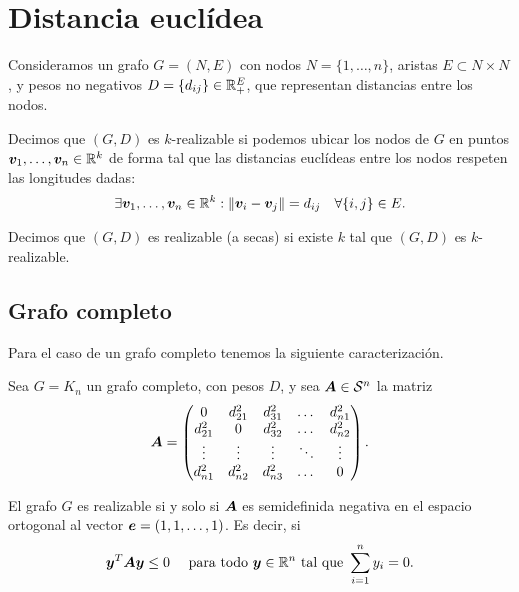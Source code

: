 \section{Distancia euclídea}

Consideramos un grafo $G = (N, E)$ con nodos $N = \{1, \dots, n\}$, aristas $E \subset N \times N$, y pesos no negativos $D = \{d_{ij}\} \in \mathbb{R}_+^E$, que representan distancias entre los nodos.

Decimos que $(G, D)$ es $k$-realizable si podemos ubicar los nodos de $G$ en puntos $\bm{v}_1, \dots, \bm{v}_n \in \mathbb{R}^k$ de forma tal que las distancias euclídeas entre los nodos respeten las longitudes dadas:
$$
\exists \bm{v}_1, \dots, \bm{v}_n \in \mathbb{R}^k:  \| \bm{v}_i - \bm{v}_j \| = d_{ij} \quad \forall \{i, j\} \in E.
$$

Decimos que $(G, D)$ es realizable (a secas) si existe $k$ tal que $(G, D)$ es $k$-realizable.

\subsection{Grafo completo}

Para el caso de un grafo completo tenemos la siguiente caracterización.

\begin{theorem}
Sea $G = K_n$ un grafo completo, con pesos $D$, y sea $\bm{A} \in {\mathcal S}^{n}$ la matriz
{\small
$$
\bm{A} = \begin{pmatrix}
0 & d_{21}^2 & d_{31}^2 & \dots & d_{n1}^2 \\
d_{21}^2 & 0 & d_{32}^2 & \dots & d_{n2}^2 \\
\vdots & \vdots & \vdots & \ddots & \vdots \\
d_{n1}^2 & d_{n2}^2 & d_{n3}^2 & \dots & 0
\end{pmatrix}.
$$}
\vspace{-0.5cm}

El grafo $G$ es realizable si y solo si $\bm{A}$ es semidefinida negativa en el espacio ortogonal al vector $\bm{e} = (1, 1, \dots, 1)$. Es decir, si
$$
\bm{y}^T \bm{A} \bm{y} \le 0 \quad \text{ para todo } \bm{y} \in \mathbb{R}^n \text{ tal que } \sum_{i=1}^n y_i = 0.
$$
\end{theorem}

